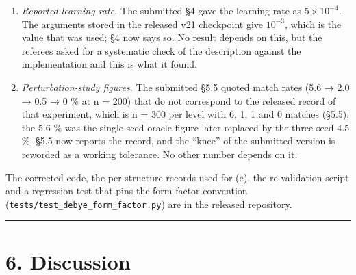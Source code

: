 \documentclass[
  11pt,
]{article}
\begin{document}
\begin{enumerate}
  submitted runs, and they are superseded by the v22 retrain of (a),
  which is what §5.2 now reports. The script now scores unindexed
  patterns as misses and records their count. The top-K rerank
  experiment of §5.4 used the same fallback; because the fallback rows
  did not match, its 1.0 \% result can only be lower, and its conclusion
  (no improvement) stands.
\item
  \emph{Reported learning rate.} The submitted §4 gave the learning rate
  as \(5\times10^{-4}\). The arguments stored in the released v21
  checkpoint give \(10^{-3}\), which is the value that was used; §4 now
  says so. No result depends on this, but the referees asked for a
  systematic check of the description against the implementation and
  this is what it found.
\item
  \emph{Perturbation-study figures.} The submitted §5.5 quoted match
  rates (5.6 → 2.0 → 0.5 → 0 \% at n = 200) that do not correspond to
  the released record of that experiment, which is n = 300 per level
  with 6, 1, 1 and 0 matches (§5.5); the 5.6 \% was the single-seed
  oracle figure later replaced by the three-seed 4.5 \%. §5.5 now
  reports the record, and the ``knee'' of the submitted version is
  reworded as a working tolerance. No other number depends on it.
\end{enumerate}

The corrected code, the per-structure records used for (c), the
re-validation script and a regression test that pins the form-factor
convention (\texttt{tests/test\_debye\_form\_factor.py}) are in the
released repository.

\begin{center}\rule{0.5\linewidth}{0.5pt}\end{center}

\section{6. Discussion}\label{discussion}
\end{document}
